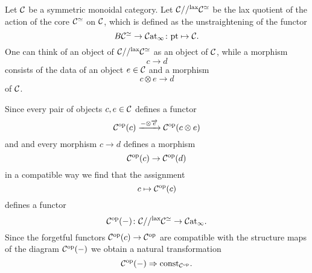 \begin{definition}
Let $\mathcal{C}$ be a symmetric monoidal category. Let $\mathcal{C} //^\mathrm{lax} \mathcal{C}^\simeq$ be the lax 
quotient of the action of the core $\mathcal{C}^\simeq$ on $\mathcal{C}$, which is defined as the unstraightening of the 
functor 
\[
B\mathcal{C}^\simeq \to \mathcal{C}\mathrm{at}_{\infty} \colon \mathrm{pt} \mapsto \mathcal{C}.
\]
One can think of an object of $\mathcal{C} //^\mathrm{lax} \mathcal{C}^\simeq$ as an object of $\mathcal{C}$, while a morphism 
\[
  c \to d  
\]
consists of the data of an object $e \in \mathcal{C}$ and a morphism 
\[
  c \otimes e \to d  
\]
of $\mathcal{C}$.
\end{definition}
\begin{definition}
Since every pair of objects $c,e \in \mathcal{C}$ defines a functor 
\[
  \mathcal{C}^{\mathrm{op}}(c) \xrightarrow{-\otimes \overrightarrow{e}} \mathcal{C}^{\mathrm{op}}(c \otimes e)  
\]
and and every morphism $c \to d$ defines a morphism 
\[
  \mathcal{C}^{\mathrm{op}}(c) \to \mathcal{C}^{\mathrm{op}}(d)  
\]
in a compatible way we find that the assignment
\[
    c \mapsto \mathcal{C}^{\mathrm{op}}(c)
\]
defines a functor 
\[
 \mathcal{C}^{\mathrm{op}}(-) \colon \mathcal{C} //^\mathrm{lax} \mathcal{C}^\simeq \to \mathcal{C}\mathrm{at}_{\infty}. 
\]
Since the forgetful functors $\mathcal{C}^{\mathrm{op}}(c) \to \mathcal{C}^{\mathrm{op}}$ are compatible with the structure maps of the diagram $\mathcal{C}^{\mathrm{op}}(-)$ we obtain 
a natural transformation 
\[\mathcal{C}^{\mathrm{op}}(-) \Rightarrow \mathrm{const_{\mathcal{C}^{\mathrm{op}}}}.\]
\end{definition}

\begin{lemma}

\end{lemma}
